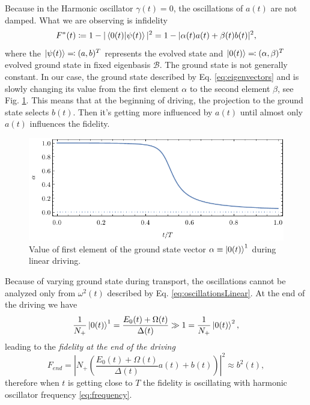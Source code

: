 Because in the Harmonic oscillator $\gamma(t)=0$, the oscillations of $a(t)$ are not damped. What we are observing is infidelity 
$$F^*(t)\coloneqq 1- |\braket{0(t)|\psi(t)}|^2 = 1-|\alpha(t)a(t)+\beta(t)b(t)|^2, $$
where the $\ket{\psi(t)}\eqqcolon(a,b)^T$ represents the evolved state and $\ket{0(t)}\eqqcolon(\alpha,\beta)^T$ evolved ground state in fixed eigenbasis $\mathcal{B}$. The ground state is not generally constant. In our case, the ground state described by Eq. \ref{eq:eigenvectors} and is slowly changing its value from the first element $\alpha$ to the second element $\beta$, see Fig. \ref{fig:zeroState}. This means that at the beginning of driving, the projection to the ground state selects $b(t)$. Then it's getting more influenced by $a(t)$ until almost only $a(t)$ influences the fidelity.
\begin{figure}[H]
    \centering
    \includegraphics[scale=1.2]{../img/zeroState.pdf}
    \caption{Value of first element of the ground state vector $\alpha\equiv \ket{0(t)}^1$ during linear driving.}
    \label{fig:zeroState}
\end{figure}

Because of varying ground state during transport, the oscillations cannot be analyzed only from $\omega^2(t)$ described by Eq. \ref{eq:oscillationsLinear}. At the end of the driving we have 
\begin{equation}
   \frac{1}{N_+} \ket{0(t)}^1=\frac{E_0(t)+\Omega(t)}{\Delta(t)}\gg 1 =\frac{1}{N_+} \ket{0(t)}^2,
\end{equation}
leading to the \emph{fidelity at the end of the driving}
\begin{equation}
    F_{end}= \left|N_+ \left(
        \frac{E_0(t)+\Omega(t)}{\Delta(t)} a(t)+b(t)
        \right)\right|^2 \approx b^2(t),
\end{equation}
therefore when $t$ is getting close to $T$ the fidelity is oscillating with  harmonic oscillator frequency \ref{eq:frequency}.




